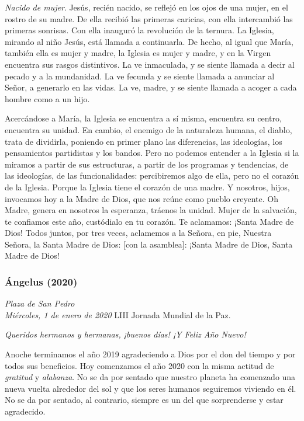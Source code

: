 \begin{body}
\begin{body}
\emph{Nacido de mujer}. Jesús, recién nacido, se reflejó en los ojos de una mujer, en el rostro de su madre. De ella recibió las primeras caricias, con ella intercambió las primeras sonrisas. Con ella inauguró la revolución de la ternura. La Iglesia, mirando al niño Jesús, está llamada a continuarla. De hecho, al igual que María, también ella es mujer y madre, la Iglesia es mujer y madre, y en la Virgen encuentra sus rasgos distintivos. La ve inmaculada, y se siente llamada a decir  al pecado y a la mundanidad. La ve fecunda y se siente llamada a anunciar al Señor, a generarlo en las vidas. La ve, madre, y se siente llamada a acoger a cada hombre como a un hijo.

Acercándose a María, la Iglesia se encuentra a sí misma, encuentra su centro, encuentra su unidad. En cambio, el enemigo de la naturaleza humana, el diablo, trata de dividirla, poniendo en primer plano las diferencias, las ideologías, los pensamientos partidistas y los bandos. Pero no podemos entender a la Iglesia si la miramos a partir de sus estructuras, a partir de los programas y tendencias, de las ideologías, de las funcionalidades: percibiremos algo de ella, pero no el corazón de la Iglesia. Porque la Iglesia tiene el corazón de una madre. Y nosotros, hijos, invocamos hoy a la Madre de Dios, que nos reúne como pueblo creyente. Oh Madre, genera en nosotros la esperanza, tráenos la unidad. Mujer de la salvación, te confiamos este año, custódialo en tu corazón. Te aclamamos: ¡Santa Madre de Dios! Todos juntos, por tres veces, aclamemos a la Señora, en pie, Nuestra Señora, la Santa Madre de Dios: {[}con la asamblea{]}: ¡Santa Madre de Dios, Santa Madre de Dios!


\subsubsection{Ángelus (2020)} 

\emph{Plaza de San Pedro\\ Miércoles, 1 de enero de 2020}
LIII Jornada Mundial de la Paz.


\emph{Queridos hermanos y hermanas, ¡buenos días! ¡Y Feliz Año Nuevo!}

Anoche terminamos el año 2019 agradeciendo a Dios por el don del tiempo y por todos sus beneficios. Hoy comenzamos el año 2020 con la misma actitud de \emph{gratitud} y \emph{alabanza}. No se da por sentado que nuestro planeta ha comenzado una nueva vuelta alrededor del sol y que los seres humanos seguiremos viviendo en él. No se da por sentado, al contrario, siempre es un  del que sorprenderse y estar agradecido.


\end{body}
\end{body}
